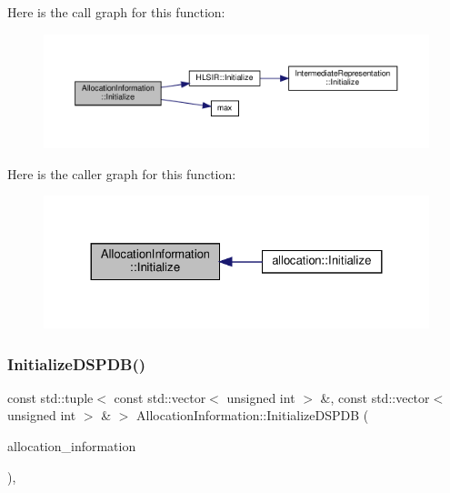 Here is the call graph for this function\+:
\nopagebreak
\begin{figure}[H]
\begin{center}
\leavevmode
\includegraphics[width=350pt]{d7/d79/classAllocationInformation_ad1263fb5b76f2dd97daacfcf3012f3e4_cgraph}
\end{center}
\end{figure}
Here is the caller graph for this function\+:
\nopagebreak
\begin{figure}[H]
\begin{center}
\leavevmode
\includegraphics[width=324pt]{d7/d79/classAllocationInformation_ad1263fb5b76f2dd97daacfcf3012f3e4_icgraph}
\end{center}
\end{figure}
\mbox{\label{classAllocationInformation_a5eef44ab205d172b0d5e47a5d55acbd7}} 
\subsubsection{\texorpdfstring{Initialize\+D\+S\+P\+D\+B()}{InitializeDSPDB()}}
{\footnotesize\ttfamily const std\+::tuple$<$ const std\+::vector$<$ unsigned int $>$ \&, const std\+::vector$<$ unsigned int $>$ \& $>$ Allocation\+Information\+::\+Initialize\+D\+S\+P\+DB (\begin{DoxyParamCaption}\item[{const \hyperlink{allocation__information_8hpp_a54287618a63bf87e31ddb17ba01e7ca7}{Allocation\+Information\+Const\+Ref}}]{allocation\+\_\+information }\end{DoxyParamCaption})\hspace{0.3cm}{\ttfamily [static]}, {\ttfamily [private]}}



